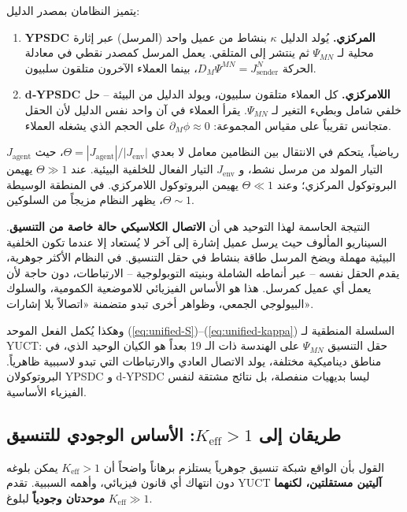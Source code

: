 \documentclass[12pt,a4paper]{article}
\begin{document}
	يتميز النظامان بمصدر الدليل:
	
	\begin{enumerate}[leftmargin=*, label=\textbf{(\arabic*)}]
		\item \textbf{YPSDC المركزي.} يُولد الدليل \(\kappa\) بنشاط من عميل واحد (المرسل) عبر إثارة محلية لـ \(\Psi_{MN}\) ثم ينتشر إلى المتلقي. يعمل المرسل كمصدر نقطي في معادلة الحركة \(D_M\Psi^{MN} = J^{N}_{\mathrm{sender}}\)، بينما العملاء الآخرون متلقون سلبيون.
		\item \textbf{d‑YPSDC اللامركزي.} كل العملاء متلقون سلبيون، ويولد الدليل من البيئة – حل خلفي شامل وبطيء التغير لـ \(\Psi_{MN}\). يقرأ العملاء في آن واحد نفس الدليل لأن الحقل متجانس تقريباً على مقياس المجموعة: \(\partial_M\phi \approx 0\) على الحجم الذي يشغله العملاء.
	\end{enumerate}
	
	رياضياً، يتحكم في الانتقال بين النظامين معامل لا بعدي \(\Theta = |J_{\mathrm{agent}}| / |J_{\mathrm{env}}|\)، حيث \(J_{\mathrm{agent}}\) التيار المولد من مرسل نشط، و \(J_{\mathrm{env}}\) التيار الفعال للخلفية البيئية. عند \(\Theta \gg 1\) يهيمن البروتوكول المركزي؛ وعند \(\Theta \ll 1\) يهيمن البروتوكول اللامركزي. في المنطقة الوسيطة \(\Theta \sim 1\)، يظهر النظام مزيجاً من السلوكين.
	
	النتيجة الحاسمة لهذا التوحيد هي أن \textbf{الاتصال الكلاسيكي حالة خاصة من التنسيق}. السيناريو المألوف حيث يرسل عميل إشارة إلى آخر لا يُستعاد إلا عندما تكون الخلفية البيئية مهملة ويضخ المرسل طاقة بنشاط في حقل التنسيق. في النظام الأكثر جوهرية، يقدم الحقل نفسه – عبر أنماطه الشاملة وبنيته التوبولوجية – الارتباطات، دون حاجة لأن يعمل أي عميل كمرسل. هذا هو الأساس الفيزيائي للاموضعية الكمومية، والسلوك البيولوجي الجمعي، وظواهر أخرى تبدو متضمنة «اتصالاً بلا إشارات».
	
	وهكذا يُكمل الفعل الموحد (\ref{eq:unified-S})–(\ref{eq:unified-kappa}) السلسلة المنطقية لـ YUCT: حقل التنسيق \(\Psi_{MN}\) على الهندسة ذات الـ 19 بعداً هو الكيان الوحيد الذي، في مناطق ديناميكية مختلفة، يولد الاتصال العادي والارتباطات التي تبدو لاسببية ظاهرياً. البروتوكولان YPSDC و d‑YPSDC ليسا بديهيات منفصلة، بل نتائج مشتقة لنفس الفيزياء الأساسية.
	
	\subsection{طريقان إلى \(K_{\mathrm{eff}} > 1\): الأساس الوجودي للتنسيق}
	\label{subsec:two-paths-ontology}
	
	القول بأن الواقع شبكة تنسيق جوهرياً يستلزم برهاناً واضحاً أن \(K_{\mathrm{eff}} > 1\) يمكن بلوغه دون انتهاك أي قانون فيزيائي، وأهمه السببية. تقدم YUCT \textbf{آليتين مستقلتين، لكنهما موحدتان وجودياً} لبلوغ \(K_{\mathrm{eff}} \gg 1\).
	
\end{document}

